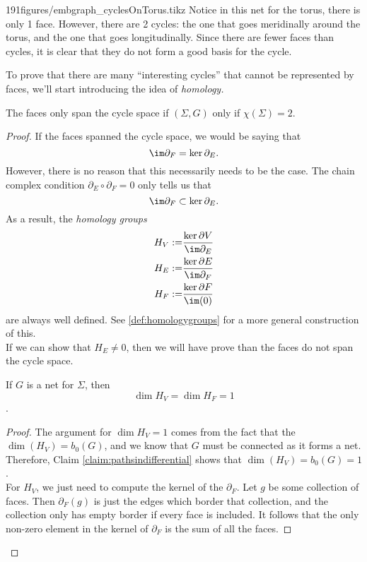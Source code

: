 \begin{examplefigureenv}{191figures/embgraph_cyclesOnTorus.tikz}
	Notice in this net for the torus, there is only 1 face. However, there are 2 cycles: the one that goes meridinally around the torus, and the one that goes longitudinally. Since there are fewer faces than cycles, it is clear that they do not form a good basis for the cycle.
\end{examplefigureenv}
To prove that there are many ``interesting cycles'' that cannot be represented by faces, we'll start introducing the idea of \emph{homology.}
\begin{theorem}
The faces only span the cycle space if $(\Sigma, G)$ only if $\chi(\Sigma)=2.$
\end{theorem}
\begin{proof}
If the faces spanned the cycle space, we would be saying that 
\[\im \partial_F=\ker \partial_E .\]
However, there is no reason that this necessarily needs to be the case. The chain complex condition $\partial_E\circ \partial_F=0$ only tells us that 
\[\im \partial_F\subset\ker \partial_E .\]
As a result, the \emph{homology groups} 
\begin{align*}
H_V:=& \frac{\ker \partial V}{\im \partial_E}\\
H_E:=& \frac{\ker \partial E}{\im \partial_F}\\
H_F:=& \frac{\ker \partial F}{\im (0)}
\end{align*}
are always well defined. See \ref{def:homologygroups} for a more general construction of this. \\
If we can show that $H_E\neq 0$, then we will have prove than the faces do not span the cycle space. \\
\begin{lemma}
If $G$ is a net for $\Sigma$, then 
\[\dim H_V = \dim H_F =1 \].
\end{lemma}
\begin{proof}
The argument for $\dim H_V=1$ comes from the fact that the $\dim(H_V)=b_0(G)$, and we know that $G$ must be connected as it forms a net. Therefore, Claim \ref{claim:pathsindifferential} shows that $\dim(H_V)=b_0(G)=1$. \\
For $H_V$, we just need to compute the kernel of the $\partial_F$. Let $g$ be some collection of faces. Then $\partial_F(g)$ is just the edges which border that collection, and the collection only has empty border if every face is included. It follows that the only non-zero element in the kernel of $\partial_F$ is the sum of all the faces. 

\end{proof}
\end{proof}
